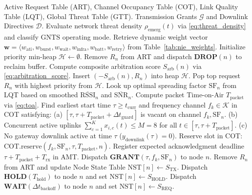 \documentclass[preprint,review,12pt]{elsarticle}
\begin{document}
\begin{algorithm}[H]
\caption{Gateway Master Scheduling and Multi-Channel Slot Allocation}
\label{alg:gateway_scheduling}
\begin{algorithmic}[1]
\REQUIRE Active Request Table (ART), Channel Occupancy Table (COT), Link Quality Table (LQT), Global Threat Table (GTT).
\ENSURE Transmission Grants $\mathcal{G}$ and Downlink Directives $\mathcal{D}$.
\STATE Evaluate network threat density $\rho_{\text{emerg}}(t)$ via \eqref{eq:threat_density} and classify $\text{GNTS}$ operating mode.
\STATE Retrieve dynamic weight vector $\mathbf{w} = \langle w_{\text{ati}}, w_{\text{burst}}, w_{\text{wait}}, w_{\text{infra}}, w_{\text{batt}}, w_{\text{retry}} \rangle$ from Table~\ref{tab:nie_weights}.
\STATE Initialize priority min-heap $\mathcal{H} \leftarrow \emptyset$.
        \STATE Remove $R_n$ from ART and dispatch $\textbf{DROP}(n)$ to reclaim buffer.
    \ELSE
        \STATE Compute composite arbitration score $S_{\text{arb}}(n)$ via \eqref{eq:arbitration_score}.
        \STATE Insert $( -S_{\text{arb}}(n), R_n )$ into heap $\mathcal{H}$.
    \ENDIF
\ENDFOR
{}
    \STATE Pop top request $R_n$ with highest priority from $\mathcal{H}$.
    \STATE Look up optimal spreading factor $\text{SF}_n$ from LQT based on smoothed $\overline{\text{RSSI}}_n$ and $\overline{\text{SNR}}_n$.
    \STATE Compute packet Time-on-Air $T_{\text{packet}}$ via \eqref{eq:toa}.
    \STATE Find earliest start time $\tau \ge t_{\text{curr}}$ and frequency channel $f_k \in \mathcal{K}$ in COT satisfying:
    \STATE \quad (a) $[\tau, \tau + T_{\text{packet}} + \Delta t_{\text{guard}}]$ is vacant on channel $f_k, \text{SF}_n$.
    \STATE \quad (b) Concurrent active uplinks $\sum_{c=1}^K x_{i,c}(t) \le M = 8$ for all $t \in [\tau, \tau + T_{\text{packet}}]$.
    \STATE \quad (c) No gateway downlink active at time $\tau$ ($y_{\text{downlink}}(\tau) = 0$).
        \STATE Reserve slot in COT: $\text{COT.reserve}(f_k, \text{SF}_n, \tau, T_{\text{packet}}, n)$.
        \STATE Register expected acknowledgment deadline $\tau + T_{\text{packet}} + T_{\text{rx}}$ in AMT.
        \STATE Dispatch $\textbf{GRANT}(\tau, f_k, \text{SF}_n)$ to node $n$.
        \STATE Remove $R_n$ from ART and update Node State Table $\text{NST}[n] \leftarrow S_{\text{TX}}$.
    \ELSE
            \STATE Dispatch $\textbf{HOLD}(T_{\text{hold}})$ to node $n$ and set $\text{NST}[n] \leftarrow S_{\text{HOLD}}$.
        \ELSE
            \STATE Dispatch $\textbf{WAIT}(\Delta t_{\text{backoff}})$ to node $n$ and set $\text{NST}[n] \leftarrow S_{\text{REQ}}$.
        \ENDIF
    \ENDIF
\ENDWHILE
\end{algorithmic}
\end{algorithm}
\end{document}

